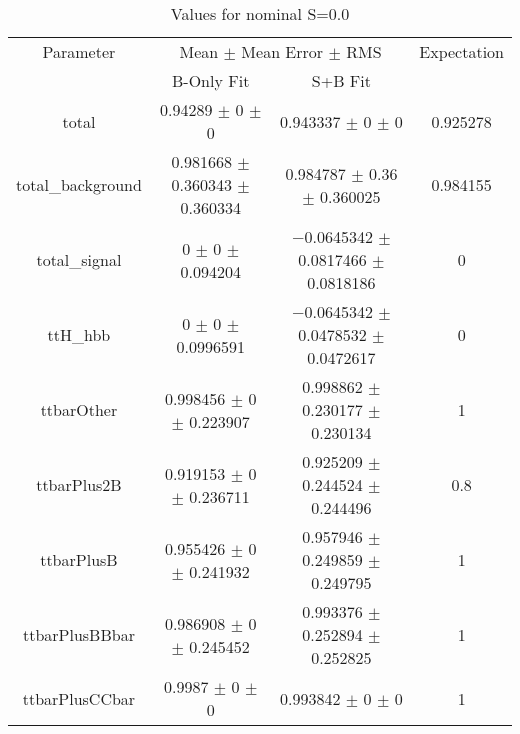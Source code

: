\begin{table}
\centering
\caption{Values for nominal S=0.0}
\begin{tabular}{cccc}
\toprule
Parameter & \multicolumn{2}{c}{Mean $\pm$ Mean Error $\pm$ RMS} & Expectation\\
 & B-Only Fit & S+B Fit & \\
\midrule
total & \num{0.94289} $\pm$ \num{0} $\pm$ \num{0} & \num{0.943337} $\pm$ \num{0} $\pm$ \num{0} & \num{0.925278}\\
total\_background & \num{0.981668} $\pm$ \num{0.360343} $\pm$ \num{0.360334} & \num{0.984787} $\pm$ \num{0.36} $\pm$ \num{0.360025} & \num{0.984155}\\
total\_signal & \num{0} $\pm$ \num{0} $\pm$ \num{0.094204} & \num{-0.0645342} $\pm$ \num{0.0817466} $\pm$ \num{0.0818186} & \num{0}\\
ttH\_hbb & \num{0} $\pm$ \num{0} $\pm$ \num{0.0996591} & \num{-0.0645342} $\pm$ \num{0.0478532} $\pm$ \num{0.0472617} & \num{0}\\
ttbarOther & \num{0.998456} $\pm$ \num{0} $\pm$ \num{0.223907} & \num{0.998862} $\pm$ \num{0.230177} $\pm$ \num{0.230134} & \num{1}\\
ttbarPlus2B & \num{0.919153} $\pm$ \num{0} $\pm$ \num{0.236711} & \num{0.925209} $\pm$ \num{0.244524} $\pm$ \num{0.244496} & \num{0.8}\\
ttbarPlusB & \num{0.955426} $\pm$ \num{0} $\pm$ \num{0.241932} & \num{0.957946} $\pm$ \num{0.249859} $\pm$ \num{0.249795} & \num{1}\\
ttbarPlusBBbar & \num{0.986908} $\pm$ \num{0} $\pm$ \num{0.245452} & \num{0.993376} $\pm$ \num{0.252894} $\pm$ \num{0.252825} & \num{1}\\
ttbarPlusCCbar & \num{0.9987} $\pm$ \num{0} $\pm$ \num{0} & \num{0.993842} $\pm$ \num{0} $\pm$ \num{0} & \num{1}\\
\bottomrule
\end{tabular}
\end{table}